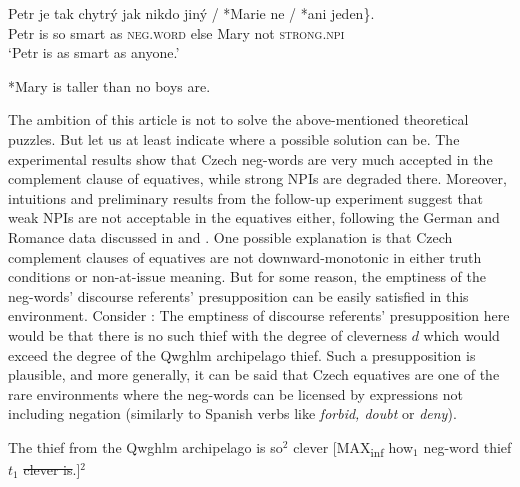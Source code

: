 \documentclass[output=paper,colorlinks,citecolor=brown]{langscibook}
\begin{document}
  
\ea\label{ex-20} \gll Petr je tak chytrý jak \minsp{\{} nikdo jiný / *Marie ne / *ani jeden\}.\\
Petr is so smart as {} \textsc{neg.word} else {} Mary not {} \textsc{strong.npi}\\
\glt `Petr is as smart as anyone.'
\z  

\ea\label{ex-21} *Mary is taller than no boys are.
\z
  
\noindent The ambition of this article is not to solve the above-mentioned theoretical puzzles. But let us at least indicate where a possible solution can be. The experimental results show that Czech neg-words are very much accepted in the complement clause of equatives, while strong NPIs are degraded there. Moreover, intuitions and preliminary results from the follow-up experiment suggest that weak NPIs are not acceptable in the equatives either, following the German and Romance data discussed in \citet{krifka1992some} and \citet{penka2016degree}. One possible explanation is that Czech complement clauses of equatives are not downward-monotonic in either truth conditions or non-at-issue meaning. But for some reason, the emptiness of the neg-words' discourse referents' presupposition can be easily satisfied in this environment. Consider : The emptiness of discourse referents' presupposition here would be that there is no such thief with the degree of cleverness $d$ which would exceed the degree of the Qwghlm archipelago thief. Such a presupposition is plausible, and more generally, it can be said that Czech equatives are one of the rare environments where the neg-words can be licensed by expressions not including negation (similarly to Spanish verbs like \textit{forbid, doubt} or \textit{deny}).

\ea\label{ex-21-eq}The thief from the Qwghlm archipelago is so$^2$ clever [MAX\textsubscript{inf} how$_1$ neg-word thief $t_1$ \sout{clever is}.]$^2$
\z
\end{document}
